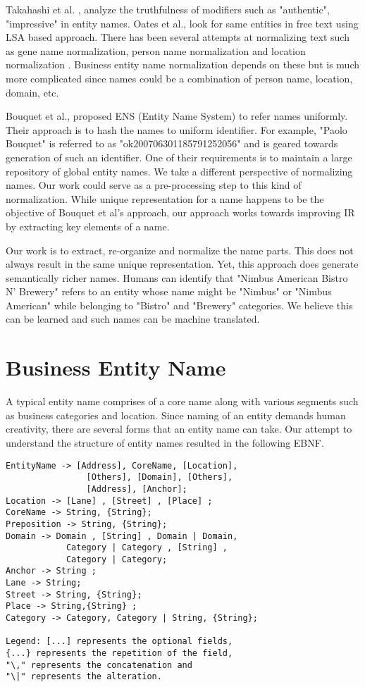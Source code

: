 \documentclass{acm_proc_article-sp}
\begin{document}
Takahashi et al. \cite{Takahashi:2010:ETM:1884017.1884070}, analyze the truthfulness of modifiers such as "authentic", "impressive" in entity names. Oates et al.,\cite{Oates:2002:ULS:584931.584939} look for same entities in free text using LSA based approach. There has been several attempts at normalizing text such as gene name normalization\cite{Fang:2006:HGN:1567619.1567627}, person name normalization\cite{Magdy:2007:ACP:1654576.1654582} and location normalization \cite{Li:2002:LNI:1072228.1072355}. Business entity name normalization depends on these but is much more complicated since names could be a combination of person name, location, domain, etc.

Bouquet et al.,\cite{Bouquet:2008:ENS:1446294.1446425} proposed ENS (Entity Name System) to refer names uniformly. Their approach is to hash the names to uniform identifier. For example, "Paolo Bouquet" is referred to as "ok200706301185791252056" and is geared towards generation of such an identifier. One of their requirements is to maintain a large repository of global entity names. We take a different perspective of normalizing names. Our work could serve as a pre-processing step to this kind of normalization. While unique representation for a name happens to be the objective of Bouquet et al's approach, our approach works towards improving IR by extracting key elements of a name. 

Our work is to extract, re-organize and normalize the name parts. This does not always result in the same unique representation. Yet, this approach does generate semantically richer names. Humans can identify that "Nimbus American Bistro N' Brewery" refers to an entity whose name might be "Nimbus" or "Nimbus American" while belonging to "Bistro" and "Brewery" categories. We believe this can be learned and such names can be machine translated.

\section{Business Entity Name}
A typical entity name comprises of a core name along with various segments such as business categories and location. Since naming of an entity demands human creativity, there are several forms that an entity name can take. Our attempt to understand the structure of entity names resulted in the following EBNF.
\begin{verbatim}
EntityName -> [Address], CoreName, [Location],
 			    [Others], [Domain], [Others], 
 			    [Address], [Anchor];
Location -> [Lane] , [Street] , [Place] ;                                 
CoreName -> String, {String};
Preposition -> String, {String};
Domain -> Domain , [String] , Domain | Domain, 
			Category | Category , [String] , 
			Category | Category;
Anchor -> String ;
Lane -> String;
Street -> String, {String};
Place -> String,{String} ;
Category -> Category, Category | String, {String};

Legend: [...] represents the optional fields, 
{...} represents the repetition of the field, 
"\," represents the concatenation and 
"\|" represents the alteration.
\end{verbatim}
\end{document}
